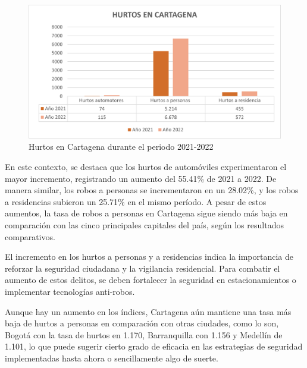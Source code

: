 \documentclass[letterpaper, 12pt]{article}
\begin{document}
\begin{figure}[H]
    \begin{center}
        \includegraphics[width=.8\linewidth]{./Images/Graph.HurtosCartagena.png}
        \caption{Hurtos en Cartagena durante el periodo 2021-2022}
        \label{fig:Graph.HurtosCartagena}
    \end{center}
\end{figure}

En este contexto, se destaca que los hurtos de automóviles
experimentaron el mayor incremento, registrando un aumento
del 55.41\% de 2021 a 2022. De manera similar, los robos a
personas se incrementaron en un 28.02\%, y los robos a
residencias subieron un 25.71\% en el mismo período. A
pesar de estos aumentos, la tasa de robos a personas en
Cartagena sigue siendo más baja en comparación con las
cinco principales capitales del país, según los resultados
comparativos.

El incremento en los hurtos a personas y a residencias
indica la importancia de reforzar la seguridad ciudadana y
la vigilancia residencial. Para combatir el aumento de
estos delitos, se deben fortalecer la seguridad en
estacionamientos o implementar tecnologías anti-robos.

Aunque hay un aumento en los índices, Cartagena aún
mantiene una tasa más baja de hurtos a personas en
comparación con otras ciudades, como lo son, Bogotá con la
tasa de hurtos en 1.170, Barranquilla con 1.156 y Medellín
de 1.101, lo que puede sugerir cierto grado de eficacia en
las estrategias de seguridad implementadas hasta ahora o
sencillamente algo de suerte.

\newpage

\printbibliography
\end{document}

